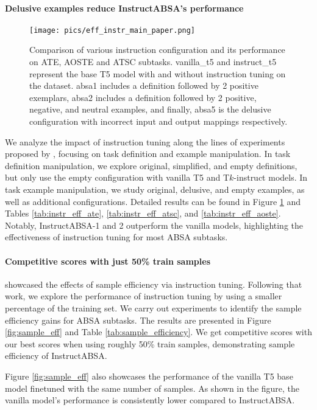 \documentclass[11pt]{article}
\newcommand{\name}{\textsc{I}nstruct\textsc{ABSA}\xspace}
\begin{document}
\paragraph{Delusive examples reduce \name{}'s performance} 

\begin{figure}[t!]
	\centering
	\texttt{[image: pics/eff\_instr\_main\_paper.png]}
	\caption{Comparison of various instruction configuration and its performance on ATE, AOSTE and ATSC subtasks. 
 vanilla\_t5 and instruct\_t5 represent the base T5 model with and without instruction tuning on the dataset. 
 absa1 includes a definition followed by 2 positive exemplars, absa2 includes a definition followed by 2 positive, negative, and neutral examples, and finally, absa5 is the delusive configuration with incorrect input and output mappings respectively.}
	\label{fig:eff_instr}
\end{figure} 


We analyze the impact of instruction tuning along the lines of experiments proposed by \citet{kung2023models}, focusing on task definition and example manipulation. 
In task definition manipulation, we explore original, simplified, and empty definitions, but only use the empty configuration with vanilla T5 and T$k$-instruct models. 
In task example manipulation, we study original, delusive, and empty examples, as well as additional configurations. 
Detailed results can be found in Figure \ref{fig:eff_instr} and Tables \ref{tab:instr_eff_ate}, \ref{tab:instr_eff_atsc}, and \ref{tab:instr_eff_aoste}. 
Notably, \name{}-1 and 2 outperform the vanilla models, highlighting the effectiveness of instruction tuning for most ABSA subtasks.

\paragraph{Competitive scores with just 50\% train samples}
\citet{gupta2023instruction} showcased the effects of sample efficiency via instruction tuning. 
Following that work, we explore the performance of instruction tuning by using a smaller percentage of the training set. 
We carry out experiments to identify the sample efficiency gains for ABSA subtasks. 
The results are presented in Figure \ref{fig:sample_eff} and Table \ref{tab:sample_efficiency}. 
We get competitive scores with our best scores when using roughly 50\% train samples, demonstrating sample efficiency of \name{}. 

Figure \ref{fig:sample_eff} also showcases the performance of the vanilla T5 base model finetuned with the same number of samples.
As shown in the figure, the vanilla model's performance is consistently lower compared to \name{}.
\end{document}
